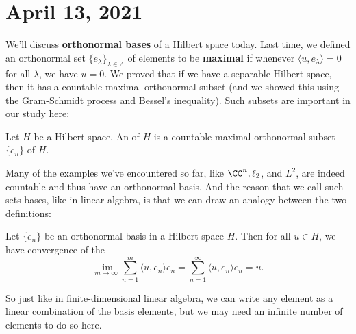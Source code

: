 
\pagebreak\section*{April 13, 2021}

We'll discuss \textbf{orthonormal bases} of a Hilbert space today. Last time, we defined an orthonormal set $\{e_{\lambda}\}_{\lambda \in \Lambda}$ of elements to be \textbf{maximal} if whenever $\langle u, e_\lambda \rangle = 0$ for all $\lambda$, we have $u = 0$. We proved that if we have a separable Hilbert space, then it has a countable maximal orthonormal subset (and we showed this using the Gram-Schmidt process and Bessel's inequality). Such subsets are important in our study here:

\begin{definition}
Let $H$ be a Hilbert space. An  of $H$ is a countable maximal orthonormal subset $\{e_n\}$ of $H$.
\end{definition}

Many of the examples we've encountered so far, like $\CC^n, \ell_2$, and $L^2$, are indeed countable and thus have an orthonormal basis. And the reason that we call such sets bases, like in linear algebra, is that we can draw an analogy between the two definitions:

\begin{theorem}\label{orthonormconv}
Let $\{e_n\}$ be an orthonormal basis in a Hilbert space $H$. Then for all $u \in H$, we have convergence of the 
\[
    \lim_{m \to \infty} \sum_{n=1}^m \langle u, e_n \rangle e_n = \sum_{n=1}^\infty \langle u, e_n \rangle e_n = u.
\]
\end{theorem}

So just like in finite-dimensional linear algebra, we can write any element as a linear combination of the basis elements, but we may need an infinite number of elements to do so here.

